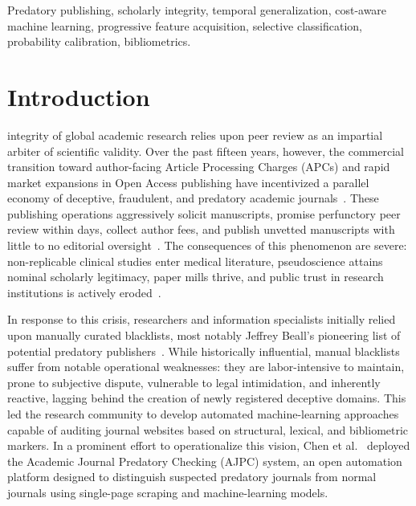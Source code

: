 \documentclass[journal]{IEEEtran}
\begin{document}
\begin{IEEEkeywords}
Predatory publishing, scholarly integrity, temporal generalization, cost-aware machine learning, progressive feature acquisition, selective classification, probability calibration, bibliometrics.
\end{IEEEkeywords}

\section{Introduction}
 integrity of global academic research relies upon peer review as an impartial arbiter of scientific validity. Over the past fifteen years, however, the commercial transition toward author-facing Article Processing Charges (APCs) and rapid market expansions in Open Access publishing have incentivized a parallel economy of deceptive, fraudulent, and predatory academic journals~\cite{beall2015criteria, shen2015longitudinal, bjork2012open}. These publishing operations aggressively solicit manuscripts, promise perfunctory peer review within days, collect author fees, and publish unvetted manuscripts with little to no editorial oversight~\cite{cobey2018what, grudniewicz2019predatory}. The consequences of this phenomenon are severe: non-replicable clinical studies enter medical literature, pseudoscience attains nominal scholarly legitimacy, paper mills thrive, and public trust in research institutions is actively eroded~\cite{moher2017stop}.

In response to this crisis, researchers and information specialists initially relied upon manually curated blacklists, most notably Jeffrey Beall's pioneering list of potential predatory publishers~\cite{beall2015criteria}. While historically influential, manual blacklists suffer from notable operational weaknesses: they are labor-intensive to maintain, prone to subjective dispute, vulnerable to legal intimidation, and inherently reactive, lagging behind the creation of newly registered deceptive domains. This led the research community to develop automated machine-learning approaches capable of auditing journal websites based on structural, lexical, and bibliometric markers. In a prominent effort to operationalize this vision, Chen et al.~\cite{chen2023open} deployed the Academic Journal Predatory Checking (AJPC) system, an open automation platform designed to distinguish suspected predatory journals from normal journals using single-page scraping and machine-learning models.
\end{document}
